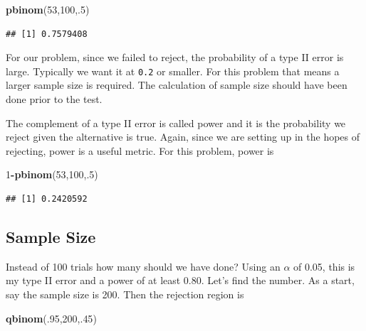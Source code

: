\documentclass[]{book}
\newenvironment{Shaded}{\begin{snugshade}}{\end{snugshade}}
\newcommand{\KeywordTok}[1]{\textcolor[rgb]{0.13,0.29,0.53}{\textbf{#1}}}
\newcommand{\DecValTok}[1]{\textcolor[rgb]{0.00,0.00,0.81}{#1}}
\newcommand{\OperatorTok}[1]{\textcolor[rgb]{0.81,0.36,0.00}{\textbf{#1}}}
\newcommand{\NormalTok}[1]{#1}
\theoremstyle{definition}
\theoremstyle{definition}
\theoremstyle{definition}
\theoremstyle{remark}
\begin{document}
\begin{Shaded}
\begin{Highlighting}[]
\KeywordTok{pbinom}\NormalTok{(}\DecValTok{53}\NormalTok{,}\DecValTok{100}\NormalTok{,.}\DecValTok{5}\NormalTok{)}
\end{Highlighting}
\end{Shaded}

\begin{verbatim}
## [1] 0.7579408
\end{verbatim}

For our problem, since we failed to reject, the probability of a type II
error is large. Typically we want it at \texttt{0.2} or smaller. For
this problem that means a larger sample size is required. The
calculation of sample size should have been done prior to the test.

The complement of a type II error is called power and it is the
probability we reject given the alternative is true. Again, since we are
setting up in the hopes of rejecting, power is a useful metric. For this
problem, power is

\begin{Shaded}
\begin{Highlighting}[]
\DecValTok{1}\OperatorTok{-}\KeywordTok{pbinom}\NormalTok{(}\DecValTok{53}\NormalTok{,}\DecValTok{100}\NormalTok{,.}\DecValTok{5}\NormalTok{)}
\end{Highlighting}
\end{Shaded}

\begin{verbatim}
## [1] 0.2420592
\end{verbatim}

\subsection{Sample Size}\label{sample-size}

Instead of 100 trials how many should we have done? Using an \(\alpha\)
of 0.05, this is my type II error and a power of at least 0.80. Let's
find the number. As a start, say the sample size is 200. Then the
rejection region is

\begin{Shaded}
\begin{Highlighting}[]
\KeywordTok{qbinom}\NormalTok{(.}\DecValTok{95}\NormalTok{,}\DecValTok{200}\NormalTok{,.}\DecValTok{45}\NormalTok{)}
\end{Highlighting}
\end{Shaded}
\end{document}
